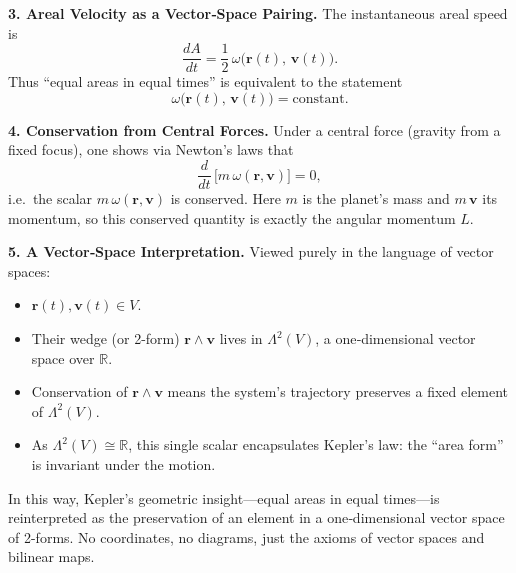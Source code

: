 \medskip
\noindent\textbf{3. Areal Velocity as a Vector‐Space Pairing.}  
The instantaneous areal speed is
\[
\frac{dA}{dt}
= \frac12\,\omega\bigl(\mathbf r(t),\,\mathbf v(t)\bigr).
\]
Thus “equal areas in equal times” is equivalent to the statement
\[
\omega\bigl(\mathbf r(t),\,\mathbf v(t)\bigr)
=\text{constant}.
\]

\medskip
\noindent\textbf{4. Conservation from Central Forces.}  
Under a central force (gravity from a fixed focus), one shows via Newton’s laws that
\[
\frac{d}{dt}\,\bigl[m\,\omega(\mathbf r,\mathbf v)\bigr]
=0,
\]
i.e.\ the scalar \(m\,\omega(\mathbf r,\mathbf v)\) is conserved.  Here \(m\) is the planet’s mass and \(m\,\mathbf v\) its momentum, so this conserved quantity is exactly the angular momentum \(L\).  

\medskip
\noindent\textbf{5. A Vector‐Space Interpretation.}  
Viewed purely in the language of vector spaces:
\begin{itemize}
  \item \(\mathbf r(t),\mathbf v(t)\in V\).  
  \item Their wedge (or 2-form) \(\mathbf r\wedge\mathbf v\) lives in \(\Lambda^2(V)\), a one‐dimensional vector space over \(\mathbb R\).  
  \item Conservation of \(\mathbf r\wedge\mathbf v\) means the system’s trajectory preserves a fixed element of \(\Lambda^2(V)\).  
  \item As \(\Lambda^2(V)\cong\mathbb R\), this single scalar encapsulates Kepler’s law: the “area form” is invariant under the motion.
\end{itemize}

\noindent In this way, Kepler’s geometric insight—equal areas in equal times—is reinterpreted as the preservation of an element in a one‐dimensional vector space of 2-forms.  No coordinates, no diagrams, just the axioms of vector spaces and bilinear maps.  
